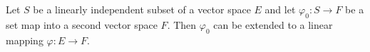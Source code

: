 Let $S$ be a linearly independent subset of a vector space $E$ and let $\varphi_0: S \rightarrow F$ be a set map into a second vector space $F$. Then $\varphi_0$ can be extended to a linear mapping $\varphi: E \rightarrow F$.
